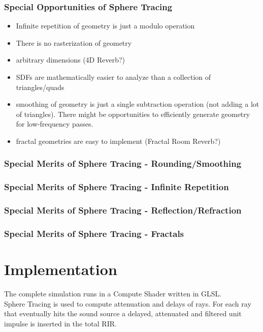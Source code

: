 \documentclass[aspectratio=169]{beamer}
\begin{document}
\begin{frame}
\frametitle{Special Opportunities of Sphere Tracing}
\begin{itemize}
\item Infinite repetition of geometry is just a modulo operation 
\item There is no rasterization of geometry
\item arbitrary dimensions (4D Reverb?)
\item SDFs are mathematically easier to analyze than a collection of triangles/quads
\item smoothing of geometry is just a single subtraction operation (not adding a lot of triangles). There might be opportunities to efficiently generate geometry for low-frequency passes.
\item fractal geometries are easy to implement (Fractal Room Reverb?)

\end{itemize}
\end{frame}


\begin{frame}
\frametitle{Special Merits of Sphere Tracing - Rounding/Smoothing}
\end{frame}

\begin{frame}
\frametitle{Special Merits of Sphere Tracing - Infinite Repetition}
\end{frame}

\begin{frame}
\frametitle{Special Merits of Sphere Tracing - Reflection/Refraction}
\end{frame}

\begin{frame}
\frametitle{Special Merits of Sphere Tracing - Fractals}
\end{frame}

\section{Implementation}
\begin{frame}
The complete simulation runs in a Compute Shader written in GLSL. \\

Sphere Tracing is used to compute attenuation and delays of rays. For each ray that eventually hits the sound source a delayed, attenuated and filtered unit impulse is inserted in the total RIR.

\end{frame}
\end{document}
